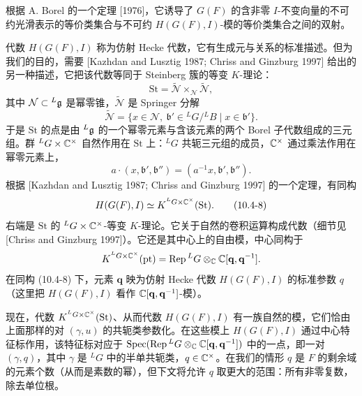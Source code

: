 根据 A. Borel 的一个定理 [1976]，它诱导了 $G(F)$ 的含非零 $I$-不变向量的不可约光滑表示的等价类集合与不可约 $H(G(F),I)$-模的等价类集合之间的双射。

代数 $H(G(F),I)$ 称为仿射 Hecke 代数，它有生成元与关系的标准描述。但为我们的目的，需要 [Kazhdan and Lusztig 1987; Chriss and Ginzburg 1997] 给出的另一种描述，它把该代数等同于 Steinberg 簇的等变 $K$-理论：
\[
    \mathrm{St}=\widetilde{\mathcal{N}}\times_{\mathcal{N}}\widetilde{\mathcal{N}},
\]
其中 $\mathcal{N}\subset{}^L\mathfrak{g}$ 是幂零锥，$\widetilde{\mathcal{N}}$ 是 Springer 分解
\[
    \widetilde{\mathcal{N}}=\{x\in\mathcal{N},\ \mathfrak{b}'\in{}^L G/{}^L B\mid x\in\mathfrak{b}'\}.
\]
于是 $\mathrm{St}$ 的点是由 ${}^L\mathfrak{g}$ 的一个幂零元素与含该元素的两个 Borel 子代数组成的三元组。群 ${}^L G\times\mathbb{C}^\times$ 自然作用在 $\mathrm{St}$ 上：${}^L G$ 共轭三元组的成员，$\mathbb{C}^\times$ 通过乘法作用在幂零元素上，
\begin{equation}
    a\cdot(x,\mathfrak{b}',\mathfrak{b}'')=(a^{-1}x,\mathfrak{b}',\mathfrak{b}'').
    \tag{10.4-7}
\end{equation}
根据 [Kazhdan and Lusztig 1987; Chriss and Ginzburg 1997] 的一个定理，有同构
\begin{equation}
    H(G(F),I)\simeq K^{{}^L G\times\mathbb{C}^\times}(\mathrm{St}).
    \tag{10.4-8}
\end{equation}
右端是 $\mathrm{St}$ 的 ${}^L G\times\mathbb{C}^\times$-等变 $K$-理论。它关于自然的卷积运算构成代数（细节见 [Chriss and Ginzburg 1997]）。它还是其中心上的自由模，中心同构于
\[
    K^{{}^L G\times\mathbb{C}^\times}(\mathrm{pt})=\operatorname{Rep}{}^L G\otimes_{\mathbb{C}}\mathbb{C}[\mathbf{q},\mathbf{q}^{-1}].
\]
在同构 (10.4-8) 下，元素 $\mathbf{q}$ 映为仿射 Hecke 代数 $H(G(F),I)$ 的标准参数 $q$（这里把 $H(G(F),I)$ 看作 $\mathbb{C}[\mathbf{q},\mathbf{q}^{-1}]$-模）。

现在，代数 $K^{{}^L G\times\mathbb{C}^\times}(\mathrm{St})$、从而代数 $H(G(F),I)$ 有一族自然的模，它们恰由上面那样的对 $(\gamma,u)$ 的共轭类参数化。在这些模上 $H(G(F),I)$ 通过中心特征标作用，该特征标对应于 $\operatorname{Spec}(\operatorname{Rep}{}^L G\otimes_{\mathbb{C}}\mathbb{C}[\mathbf{q},\mathbf{q}^{-1}])$ 中的一点，即一对 $(\gamma,q)$，其中 $\gamma$ 是 ${}^L G$ 中的半单共轭类，$q\in\mathbb{C}^\times$。在我们的情形 $q$ 是 $F$ 的剩余域的元素个数（从而是素数的幂），但下文将允许 $q$ 取更大的范围：所有非零复数，除去单位根。

